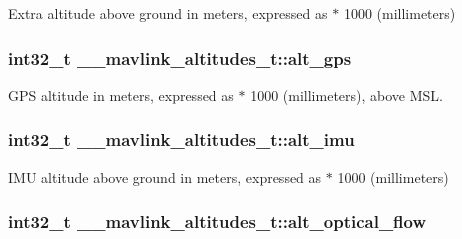 Extra altitude above ground in meters, expressed as $\ast$ 1000 (millimeters) 

\hypertarget{struct____mavlink__altitudes__t_a6d9065ed73e442a98877bd5ceae1ec62}{
\subsubsection[{alt\+\_\+gps}]{\setlength{\rightskip}{0pt plus 5cm}int32\+\_\+t \+\_\+\+\_\+mavlink\+\_\+altitudes\+\_\+t\+::alt\+\_\+gps}}\label{struct____mavlink__altitudes__t_a6d9065ed73e442a98877bd5ceae1ec62}


G\+P\+S altitude in meters, expressed as $\ast$ 1000 (millimeters), above M\+S\+L. 

\hypertarget{struct____mavlink__altitudes__t_a66967f5b3bd7335be6766f56014156ce}{
\subsubsection[{alt\+\_\+imu}]{\setlength{\rightskip}{0pt plus 5cm}int32\+\_\+t \+\_\+\+\_\+mavlink\+\_\+altitudes\+\_\+t\+::alt\+\_\+imu}}\label{struct____mavlink__altitudes__t_a66967f5b3bd7335be6766f56014156ce}


I\+M\+U altitude above ground in meters, expressed as $\ast$ 1000 (millimeters) 

\hypertarget{struct____mavlink__altitudes__t_a370a2be568401a5e530e3a51c4ec461f}{
\subsubsection[{alt\+\_\+optical\+\_\+flow}]{\setlength{\rightskip}{0pt plus 5cm}int32\+\_\+t \+\_\+\+\_\+mavlink\+\_\+altitudes\+\_\+t\+::alt\+\_\+optical\+\_\+flow}}\label{struct____mavlink__altitudes__t_a370a2be568401a5e530e3a51c4ec461f}



